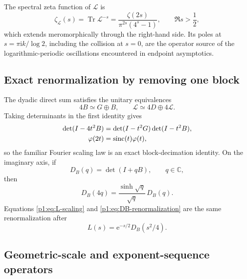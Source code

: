 \documentclass[11pt,oneside]{article}
\theoremstyle{definition}
\newcommand{\e}{\mathrm e}
\newcommand{\ii}{\mathrm i}
\newcommand{\C}{\mathbb C}
\newcommand{\sinc}{\operatorname{sinc}}
\newcommand{\Tr}{\operatorname{Tr}}
\newcommand{\phiF}{\varphi}
\begin{document}
The spectral zeta function of \(\mathscr L\) is
\begin{equation}
 \zeta_{\mathscr L}(s)=\Tr\mathscr L^{-s}
 =\frac{\zeta(2s)}{\pi^{2s}(4^s-1)},
 \qquad \Re s>\frac12,
 \label{p1:eq:L-spectral-zeta}
\end{equation}
which extends meromorphically through the right-hand side.  Its poles at
\(s=\pi\ii k/\log2\), including the collision at \(s=0\), are the operator source of
the logarithmic-periodic oscillations encountered in endpoint asymptotics.

\subsection{Exact renormalization by removing one block}

The dyadic direct sum satisfies the unitary equivalences
\begin{equation}
 4B\simeq G\oplus B,
 \qquad
 \mathscr L\simeq4D\oplus4\mathscr L.
 \label{p1:eq:operator-renormalization}
\end{equation}
Taking determinants in the first identity gives
\begin{align}
 \det(I-4t^2B)
 &=\det(I-t^2G)\det(I-t^2B),\notag\\
 \phiF(2t)&=\sinc(t)\phiF(t),
 \label{p1:eq:det-renormalization}
\end{align}
so the familiar Fourier scaling law is an exact block-decimation identity.  On the
imaginary axis, if
\begin{equation}
 D_B(q)=\det(I+qB),\qquad q\in\C,
 \label{p1:eq:DB}
\end{equation}
then
\begin{equation}
 D_B(4q)=\frac{\sinh\sqrt q}{\sqrt q}\,D_B(q).
 \label{p1:eq:DB-renormalization}
\end{equation}
Equations \eqref{p1:eq:L-scaling} and \eqref{p1:eq:DB-renormalization} are the same
renormalization after
\begin{equation}
 L(s)=\e^{-s/2}D_B(s^2/4).
 \label{p1:eq:L-DB}
\end{equation}

\subsection{Geometric-scale and exponent-sequence operators}
\label{p1:sec:operator-generalization}
\end{document}
